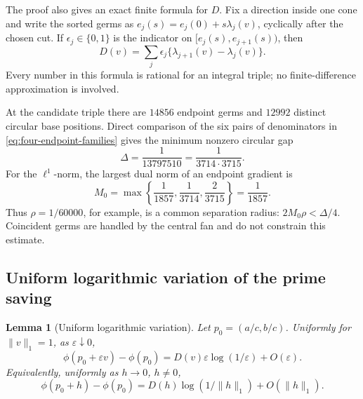 \documentclass[11pt,reqno,letterpaper]{amsart}
\numberwithin{equation}{section}
\newtheorem{lemma}[theorem]{Lemma}
\theoremstyle{definition}
\theoremstyle{remark}
\begin{document}
The proof also gives an exact finite formula for \(D\).  Fix a direction
inside one cone and write the sorted germs as
\(e_j(s)=e_j(0)+s\lambda_j(v)\), cyclically after the chosen cut.  If
\(\epsilon_j\in\{0,1\}\) is the indicator on
\([e_j(s),e_{j+1}(s))\), then
\begin{equation}\label{eq:D-endpoint-formula}
 \boxed{D(v)=\sum_j\epsilon_j
       \{\lambda_{j+1}(v)-\lambda_j(v)\}.}
\end{equation}
Every number in this formula is rational for an integral triple; no
finite-difference approximation is involved.

At the candidate triple there are \(14856\) endpoint germs and \(12992\)
distinct circular base positions.  Direct comparison of the six pairs
of denominators in \eqref{eq:four-endpoint-families} gives the minimum
nonzero circular gap
\begin{equation}\label{eq:local-minimum-endpoint-gap}
 \Delta=\frac1{13797510}=\frac1{3714\cdot3715}.
\end{equation}
For the \(\ell^1\)-norm, the largest dual norm of an endpoint gradient is
\[
 M_0=\max\left\{\frac1{1857},\frac1{3714},
                       \frac2{3715}\right\}=\frac1{1857}.
\]
Thus \(\rho=1/60000\), for example, is a common separation radius:
\(2M_0\rho<\Delta/4\).  Coincident germs are handled by the central
fan and do not constrain this estimate.

\subsection{Uniform logarithmic variation of the prime saving}

\begin{lemma}[Uniform logarithmic variation]\label{lem:uniform-log-variation}
Let \(p_0=(a/c,b/c)\).  Uniformly for \(\|v\|_1=1\), as
\(\varepsilon\downarrow0\),
\begin{equation}\label{eq:uniform-log-variation}
 \phi(p_0+\varepsilon v)-\phi(p_0)
 =D(v)\varepsilon\log(1/\varepsilon)+O(\varepsilon).
\end{equation}
Equivalently, uniformly as \(h\to0\), \(h\ne0\),
\begin{equation}\label{eq:uniform-log-variation-h}
 \phi(p_0+h)-\phi(p_0)
 =D(h)\log(1/\|h\|_1)+O(\|h\|_1).
\end{equation}
\end{lemma}
\end{document}
